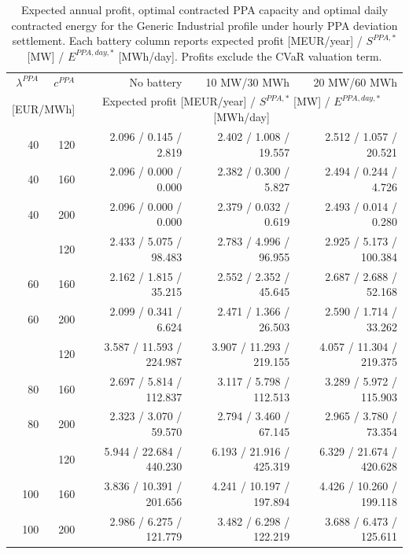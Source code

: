 \begin{table}[htbp]
\centering
\small
\caption{Expected annual profit, optimal contracted PPA capacity and optimal daily contracted energy for the Generic Industrial profile under hourly PPA deviation settlement. Each battery column reports expected profit [MEUR/year] / $S^{PPA,*}$ [MW] / $E^{PPA,day,*}$ [MWh/day]. Profits exclude the CVaR valuation term.}
\label{tab:battery_sensitivity_generic_industrial}
\begin{tabular*}{\textwidth}{@{\extracolsep{\fill}}rrrrr@{}}
\toprule
$\lambda^{PPA}$ & $c^{PPA}$ & No battery & 10 MW/30 MWh & 20 MW/60 MWh \\
\multicolumn{2}{c}{[EUR/MWh]} & \multicolumn{3}{c}{Expected profit [MEUR/year] / $S^{PPA,*}$ [MW] / $E^{PPA,day,*}$ [MWh/day]} \\
\midrule
40 & 120 & 2.096 / 0.145 / 2.819 & 2.402 / 1.008 / 19.557 & 2.512 / 1.057 / 20.521 \\
40 & 160 & 2.096 / 0.000 / 0.000 & 2.382 / 0.300 / 5.827 & 2.494 / 0.244 / 4.726 \\
40 & 200 & 2.096 / 0.000 / 0.000 & 2.379 / 0.032 / 0.619 & 2.493 / 0.014 / 0.280 \\
\addlinespace
60 & 120 & 2.433 / 5.075 / 98.483 & 2.783 / 4.996 / 96.955 & 2.925 / 5.173 / 100.384 \\
60 & 160 & 2.162 / 1.815 / 35.215 & 2.552 / 2.352 / 45.645 & 2.687 / 2.688 / 52.168 \\
60 & 200 & 2.099 / 0.341 / 6.624 & 2.471 / 1.366 / 26.503 & 2.590 / 1.714 / 33.262 \\
\addlinespace
80 & 120 & 3.587 / 11.593 / 224.987 & 3.907 / 11.293 / 219.155 & 4.057 / 11.304 / 219.375 \\
80 & 160 & 2.697 / 5.814 / 112.837 & 3.117 / 5.798 / 112.513 & 3.289 / 5.972 / 115.903 \\
80 & 200 & 2.323 / 3.070 / 59.570 & 2.794 / 3.460 / 67.145 & 2.965 / 3.780 / 73.354 \\
\addlinespace
100 & 120 & 5.944 / 22.684 / 440.230 & 6.193 / 21.916 / 425.319 & 6.329 / 21.674 / 420.628 \\
100 & 160 & 3.836 / 10.391 / 201.656 & 4.241 / 10.197 / 197.894 & 4.426 / 10.260 / 199.118 \\
100 & 200 & 2.986 / 6.275 / 121.779 & 3.482 / 6.298 / 122.219 & 3.688 / 6.473 / 125.611 \\
\bottomrule
\end{tabular*}
\end{table}


